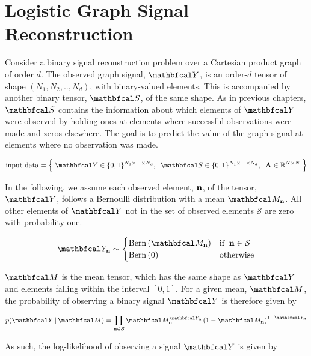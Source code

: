 \section{Logistic Graph Signal Reconstruction}

\label{sec:lgsr}



Consider a binary signal reconstruction problem over a Cartesian product graph of order $d$. The observed graph signal, $\Yt$, is an order-$d$ tensor of shape $(N_1, N_2, .., N_d)$, with binary-valued elements. This is accompanied by another binary tensor, $\St$, of the same shape. As in previous chapters, $\St$ contains the information about which elements of $\Yt$ were observed by holding ones at elements where successful observations were made and zeros elsewhere. The goal is to predict the value of the graph signal at elements where no observation was made. 

\begin{equation*}
    \text{input data} = \Big\{\; \Yt \in \{0, 1\}^{N_1 \times ... \times N_d}, \;\; \St \in \{0, 1\}^{N_1 \times ... \times N_d} , \;\; \A \in \R^{N \times N} \; \Big\}
\end{equation*}

In the following, we assume each observed element, $\mathbf{n}$, of the tensor, $\Yt$, follows a Bernoulli distribution with a mean $\Mt_\nn$. All other elements of $\Yt$ not in the set of observed elements $\mathcal{S}$ are zero with probability one. 

\begin{equation}
    \Yt_\nn \sim  \begin{cases}
        \text{Bern}\left(\Mt_\nn \right) & \text{if} \;\; \nn \in \mathcal{S} \\
        \text{Bern}\left(0\right) & \text{otherwise}
    \end{cases}
\end{equation}


$\Mt$ is the mean tensor, which has the same shape as $\Yt$ and elements falling within the interval $[0, 1]$. For a given mean, $\Mt$, the probability of observing a binary signal $\Yt$ is therefore given by 

\begin{equation}
    p(\Yt \, | \, \Mt) = \prod_{\nn \in \mathcal{S}} \Mt_\nn^{\Yt_\nn}\left(1 - \Mt_\nn\right)^{1 - \Yt_\nn}
\end{equation}

As such, the log-likelihood of observing a signal $\Yt$ is given by 

